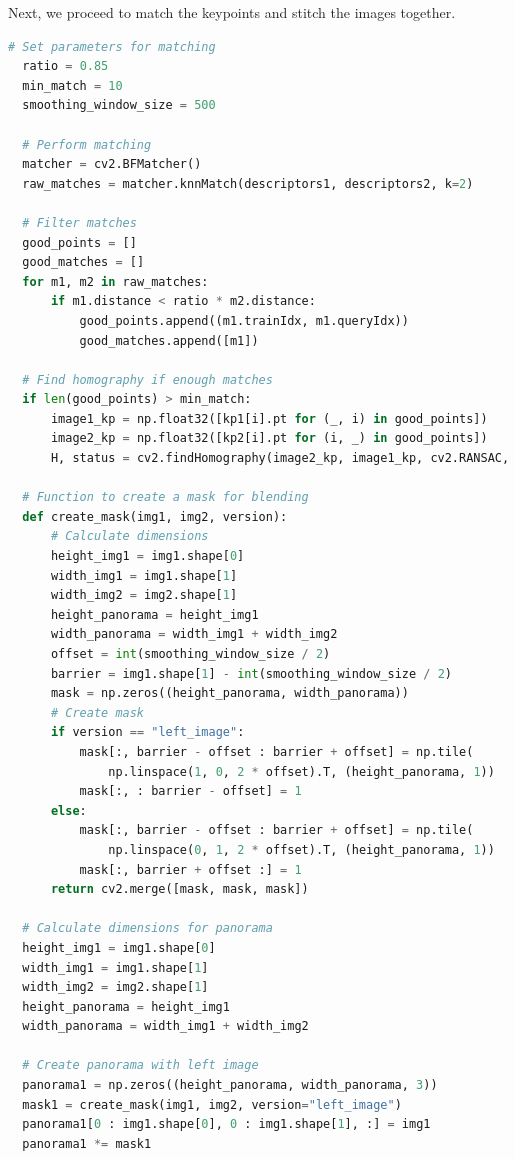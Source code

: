 \documentclass[11pt,a4paper]{article}
\begin{document}
Next, we proceed to match the keypoints and stitch the images together.

\begin{lstlisting}[language=Python, caption=Matching keypoints and stitching images]
  # Set parameters for matching
  ratio = 0.85
  min_match = 10
  smoothing_window_size = 500

  # Perform matching
  matcher = cv2.BFMatcher()
  raw_matches = matcher.knnMatch(descriptors1, descriptors2, k=2)

  # Filter matches
  good_points = []
  good_matches = []
  for m1, m2 in raw_matches:
      if m1.distance < ratio * m2.distance:
          good_points.append((m1.trainIdx, m1.queryIdx))
          good_matches.append([m1])

  # Find homography if enough matches
  if len(good_points) > min_match:
      image1_kp = np.float32([kp1[i].pt for (_, i) in good_points])
      image2_kp = np.float32([kp2[i].pt for (i, _) in good_points])
      H, status = cv2.findHomography(image2_kp, image1_kp, cv2.RANSAC, 5.0)

  # Function to create a mask for blending
  def create_mask(img1, img2, version):
      # Calculate dimensions
      height_img1 = img1.shape[0]
      width_img1 = img1.shape[1]
      width_img2 = img2.shape[1]
      height_panorama = height_img1
      width_panorama = width_img1 + width_img2
      offset = int(smoothing_window_size / 2)
      barrier = img1.shape[1] - int(smoothing_window_size / 2)
      mask = np.zeros((height_panorama, width_panorama))
      # Create mask
      if version == "left_image":
          mask[:, barrier - offset : barrier + offset] = np.tile(
              np.linspace(1, 0, 2 * offset).T, (height_panorama, 1))
          mask[:, : barrier - offset] = 1
      else:
          mask[:, barrier - offset : barrier + offset] = np.tile(
              np.linspace(0, 1, 2 * offset).T, (height_panorama, 1))
          mask[:, barrier + offset :] = 1
      return cv2.merge([mask, mask, mask])

  # Calculate dimensions for panorama
  height_img1 = img1.shape[0]
  width_img1 = img1.shape[1]
  width_img2 = img2.shape[1]
  height_panorama = height_img1
  width_panorama = width_img1 + width_img2

  # Create panorama with left image
  panorama1 = np.zeros((height_panorama, width_panorama, 3))
  mask1 = create_mask(img1, img2, version="left_image")
  panorama1[0 : img1.shape[0], 0 : img1.shape[1], :] = img1
  panorama1 *= mask1


\end{lstlisting}
\end{document}
